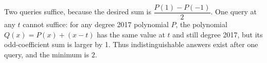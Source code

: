 Two queries suffice, because the desired sum is $\dfrac{P(1)-P(-1)}{2}$. One query at any $ t $ cannot suffice: for any degree 2017 polynomial $ P $, the polynomial $ Q(x)=P(x)+(x-t)$ has the same value at $ t $ and still degree 2017, but its odd-coefficient sum is larger by 1. Thus indistinguishable answers exist after one query, and the minimum is $\boxed2 $.
